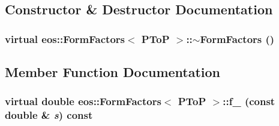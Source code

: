 \subsection{Constructor \& Destructor Documentation}
\hypertarget{classeos_1_1FormFactors_3_01PToP_01_4_a2e81880c8a11bbe98466cd077c41b2b2}{
\subsubsection[{$\sim$FormFactors}]{\setlength{\rightskip}{0pt plus 5cm}virtual eos::FormFactors$<$ {\bf PToP} $>$::$\sim$FormFactors ()}}
\label{classeos_1_1FormFactors_3_01PToP_01_4_a2e81880c8a11bbe98466cd077c41b2b2}


\subsection{Member Function Documentation}
\hypertarget{classeos_1_1FormFactors_3_01PToP_01_4_a097a12cde6acb9004d1a92cbb8e60734}{
\subsubsection[{f\_\-0}]{\setlength{\rightskip}{0pt plus 5cm}virtual double eos::FormFactors$<$ {\bf PToP} $>$::f\_ (const double \& {\em s}) const}}
\label{classeos_1_1FormFactors_3_01PToP_01_4_a097a12cde6acb9004d1a92cbb8e60734}


